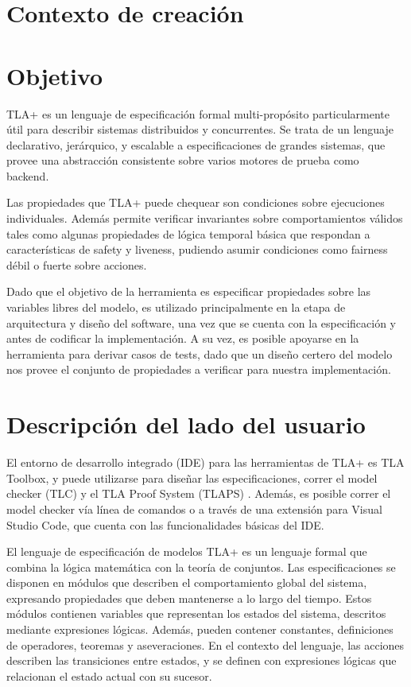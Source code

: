\documentclass[runningheads]{llncs}
\begin{document}
\section{Contexto de creación}

\section{Objetivo}
TLA+ es un lenguaje de especificación formal multi-propósito particularmente útil para describir sistemas distribuidos y concurrentes. Se trata de un lenguaje declarativo, jerárquico, y escalable a especificaciones de grandes sistemas, que provee una abstracción consistente sobre varios motores de prueba como backend. 

Las propiedades que TLA+ puede chequear son condiciones sobre ejecuciones individuales. Además permite verificar invariantes sobre comportamientos válidos tales como algunas propiedades de lógica temporal básica que respondan a características de safety y liveness, pudiendo asumir condiciones como fairness débil o fuerte sobre acciones.

Dado que el objetivo de la herramienta es especificar propiedades sobre las variables libres del modelo, es utilizado principalmente en la etapa de arquitectura y diseño del software, una vez que se cuenta con la especificación y antes de codificar la implementación. A su vez, es posible apoyarse en la herramienta para derivar casos de tests, dado que un diseño certero del modelo nos provee el conjunto de propiedades a verificar para nuestra implementación.

\section{Descripción del lado del usuario}
El entorno de desarrollo integrado (IDE) para las herramientas de TLA+ es TLA Toolbox, y puede utilizarse para diseñar las especificaciones, correr el model checker (TLC) y el TLA Proof System (TLAPS) \cite{tla}. Además, es posible correr el model checker vía línea de comandos \cite{book} o a través de una extensión para Visual Studio Code, que cuenta con las funcionalidades básicas del IDE.

El lenguaje de especificación de modelos TLA+ es un lenguaje formal que combina la lógica matemática con la teoría de conjuntos. Las especificaciones se disponen en módulos que describen el comportamiento global del sistema, expresando propiedades que deben mantenerse a lo largo del tiempo. Estos módulos contienen variables que representan los estados del sistema, descritos mediante expresiones lógicas. Además, pueden contener constantes, definiciones de operadores, teoremas y aseveraciones. En el contexto del lenguaje, las acciones describen las transiciones entre estados, y se definen con expresiones lógicas que relacionan el estado actual con su sucesor.
\end{document}
